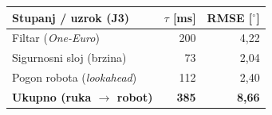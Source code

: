 \begin{tabular}{l rr}
\hline
\textbf{Stupanj / uzrok (J3)} & \small $\tau$ [ms] & \small RMSE [$^\circ$] \\
\hline
Filtar (\textit{One-Euro}) & 200 & 4,22 \\
Sigurnosni sloj (brzina) & 73 & 2,04 \\
Pogon robota (\textit{lookahead}) & 112 & 2,40 \\
\hline
\textbf{Ukupno (ruka $\rightarrow$ robot)} & \textbf{385} & \textbf{8,66} \\
\hline
\end{tabular}
